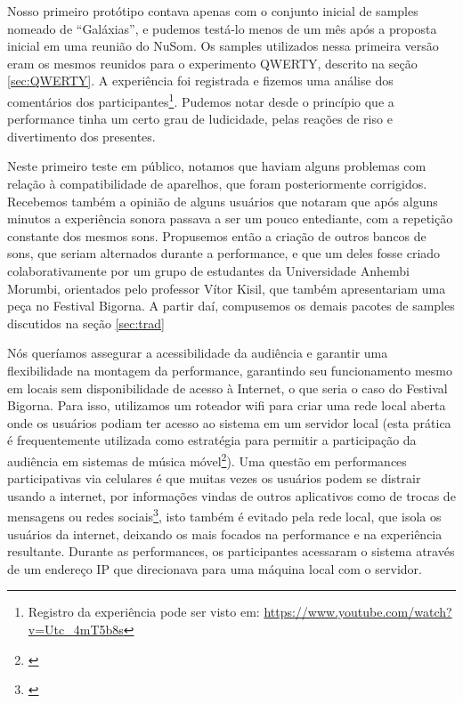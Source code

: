 Nosso primeiro protótipo contava apenas com o conjunto inicial de samples nomeado de ``Galáxias'', e pudemos testá-lo menos de um mês após a proposta inicial em uma reunião do NuSom. Os samples utilizados nessa primeira versão eram os mesmos reunidos para o experimento QWERTY, descrito na seção \ref{sec:QWERTY}. A experiência foi registrada e fizemos uma análise dos comentários dos participantes\footnote{Registro da experiência pode ser visto em: \url{https://www.youtube.com/watch?v=Utc_4mT5b8s}}. Pudemos notar desde o princípio que a performance tinha um certo grau de ludicidade, pelas reações de riso e divertimento dos presentes. 


Neste primeiro teste em público, notamos que haviam alguns problemas com relação à compatibilidade de aparelhos, que foram posteriormente corrigidos. Recebemos também a opinião de alguns usuários que notaram que após alguns minutos a experiência sonora passava a ser um pouco entediante, com a repetição constante dos mesmos sons. Propusemos então a criação de outros bancos de sons, que seriam alternados durante a performance, e que um deles fosse criado colaborativamente por um grupo de estudantes da Universidade Anhembi Morumbi, orientados pelo professor Vítor Kisil,  que também apresentariam uma peça no Festival Bigorna. A partir daí, compusemos os demais pacotes de samples discutidos na seção \ref{sec:trad}



   
Nós queríamos assegurar a acessibilidade da audiência e garantir uma flexibilidade na montagem da performance, garantindo seu funcionamento mesmo em locais sem disponibilidade de acesso à Internet, o que seria o caso do Festival Bigorna. Para isso, utilizamos um roteador wifi para criar uma rede local aberta onde os usuários podiam ter acesso ao sistema em um servidor local (esta prática é frequentemente utilizada como estratégia para permitir a participação da audiência em sistemas de música móvel\footnote{\cite{Lambert:2016}}). Uma questão em performances participativas via celulares é que muitas vezes os usuários podem se distrair usando a internet, por informações vindas de outros aplicativos como de trocas de mensagens ou redes sociais\footnote{\cite{wu2017open}}, isto também é evitado pela rede local, que isola os usuários da internet, deixando os mais focados na performance e na experiência resultante. Durante as performances, os participantes acessaram o sistema através de um endereço IP que direcionava para uma máquina local com o servidor.

